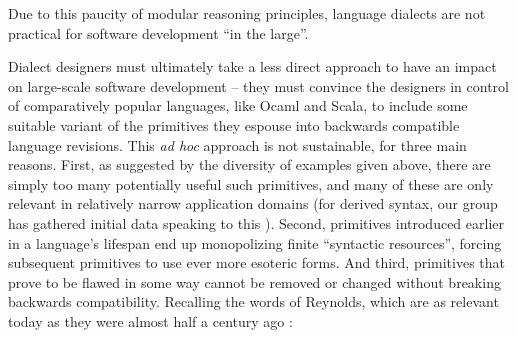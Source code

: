 Due to this paucity of modular reasoning principles, language dialects are not practical for software development ``in the large''. %

Dialect designers must ultimately take a less direct approach to have an impact on large-scale software development -- they must convince the designers in control of comparatively popular languages, like Ocaml and Scala, to include some suitable variant of the primitives they espouse into backwards compatible language revisions. %
This \emph{ad hoc} approach is not sustainable, for three main reasons. First, as suggested by the diversity of examples given above, there are simply too  many potentially useful such primitives, and many of these are only relevant in relatively narrow application domains (for derived syntax, our group has  gathered initial data speaking to this \cite{TSLs}). Second, primitives introduced earlier in a language's lifespan end up monopolizing finite ``syntactic resources'', forcing subsequent primitives to use ever more esoteric forms. And third, primitives that prove to be flawed in some way cannot be removed or changed without breaking backwards compatibility. %
Recalling the words of  Reynolds, which are as relevant today as they were almost half a century ago \cite{Reynolds70}:%
